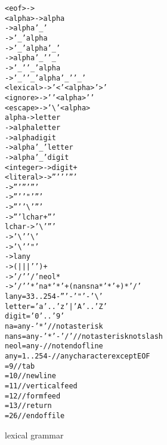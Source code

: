 \begin{figure}
  \begin{scriptsize}
    \begin{alltt}
      <eof>             -> 
      <alpha>           ->         alpha
                        ->         alpha '_'
                        ->     '_' alpha
                        ->     '_' alpha '_'
                        ->         alpha '_' '_'
                        -> '_' '_' alpha
                        -> '_' '_' alpha '_' '_'
      <lexical>         -> '<' <alpha> '>'
      <ignore>          -> '{' <alpha> '}'
      <escape>          -> '\textbackslash' <alpha>
      alpha             ->       letter
                        -> alpha letter
                        -> alpha digit
                        -> alpha '_' letter
                        -> alpha '_' digit
      <integer>         -> digit+
      <literal>         -> ''' ' ' '''
                        -> ''' ''' '''
                        -> ''' '"' '''
                        -> ''' '\textbackslash' '''
                        -> ''' lchar+ '''
      lchar             -> '\textbackslash' '''
                        -> '\textbackslash' '\textbackslash'
                        -> '\textbackslash' '"'
                        -> lany
            -> (  |  |  | ' ' )+
           -> '/' '/' neol*
          -> '/' '*' na* '*'+ (nans na* '*'+)* '/'
      lany              =  33..254 - ''' - '"' - '\textbackslash'
      letter            = 'a'..'z' | 'A'..'Z'
      digit             = '0'..'9'
      na                = any - '*'          // not asterisk
      nans              = any - '*' - '/'    // not asterisk not slash
      neol              = any -            // not end of line
      any               = 1..254 -         // any character except EOF
                      =  9                 // tab
                      = 10                 // newline
                      = 11                 // vertical feed
                      = 12                 // form feed
                      = 13                 // return
                      = 26                 // end of file
    \end{alltt}
  \end{scriptsize}
  \caption{\dfae lexical grammar}
  \label{fig:dfa-lex-grm}
\end{figure}

